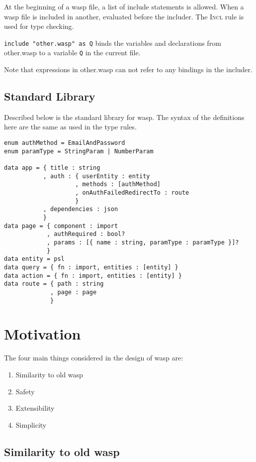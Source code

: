 At the beginning of a wasp file, a list of include statements is allowed. When
a wasp file is included in another, evaluated before the includer. The
\textsc{Incl} rule is used for type checking. 

\texttt{include "other.wasp" as Q} binds the variables and declarations from
other.wasp to a variable \texttt{Q} in the current file.

Note that expressions in other.wasp can not refer to any
bindings in the includer.

\subsection{Standard Library}

Described below is the standard library for wasp. The syntax of the definitions
here are the same as used in the type rules.

\begin{verbatim}
enum authMethod = EmailAndPassword
enum paramType = StringParam | NumberParam

data app = { title : string
           , auth : { userEntity : entity
                    , methods : [authMethod]
                    , onAuthFailedRedirectTo : route
                    }
           , dependencies : json
           }
data page = { component : import
            , authRequired : bool?
            , params : [{ name : string, paramType : paramType }]?
            }
data entity = psl
data query = { fn : import, entities : [entity] }
data action = { fn : import, entities : [entity] }
data route = { path : string
             , page : page
             }
\end{verbatim}

\section{Motivation}

The four main things considered in the design of wasp are:

\begin{enumerate}
  \item Similarity to old wasp
  \item Safety
  \item Extensibility
  \item Simplicity
\end{enumerate}

\subsection{Similarity to old wasp}


